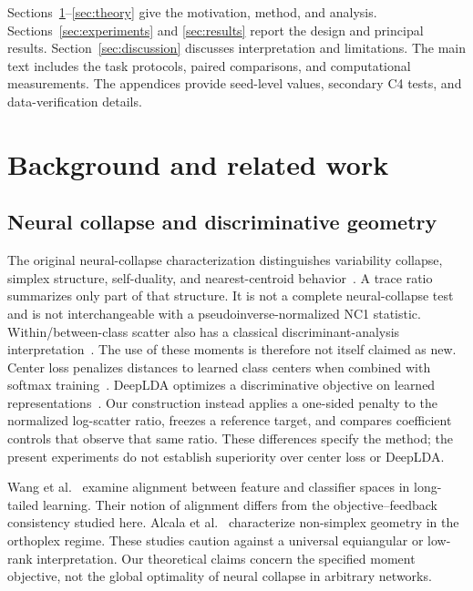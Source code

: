 \documentclass[a4paper,fleqn]{cas-dc}
\begin{document}
Sections~\ref{sec:background}--\ref{sec:theory} give the motivation,
method, and analysis. Sections~\ref{sec:experiments} and
\ref{sec:results} report the design and principal results.
Section~\ref{sec:discussion} discusses interpretation and limitations.
The main text includes the task protocols, paired comparisons, and
computational measurements. The appendices provide seed-level values,
secondary C4 tests, and data-verification details.

\section{Background and related work}\label{sec:background}

\subsection{Neural collapse and discriminative geometry}

The original neural-collapse characterization distinguishes variability
collapse, simplex structure, self-duality, and nearest-centroid
behavior~\cite{papyan2020prevalence}. A trace ratio summarizes only
part of that structure. It is not a complete neural-collapse test and
is not interchangeable with a pseudoinverse-normalized NC1 statistic.
Within/between-class scatter also has a classical
discriminant-analysis interpretation~\cite{fisher1936}. The use of
these moments is therefore not itself claimed as new.
Center loss penalizes distances to learned class centers when combined
with softmax training~\cite{wen2016center}. DeepLDA optimizes a
discriminative objective on learned representations~\cite{dorfer2016deeplda}.
Our construction instead applies a one-sided penalty to the normalized
log-scatter ratio, freezes a reference target, and compares coefficient
controls that observe that same ratio. These differences specify the
method; the present experiments do not establish superiority over center
loss or DeepLDA.

Wang et al.~\cite{wang2026alignment} examine alignment between feature
and classifier spaces in long-tailed learning. Their notion of
alignment differs from the objective--feedback consistency studied
here. Alcala et al.~\cite{alcala2026orthoplex} characterize non-simplex
geometry in the orthoplex regime. These studies caution against a
universal equiangular or low-rank interpretation. Our theoretical
claims concern the specified moment objective, not the global
optimality of neural collapse in arbitrary networks.
\end{document}
